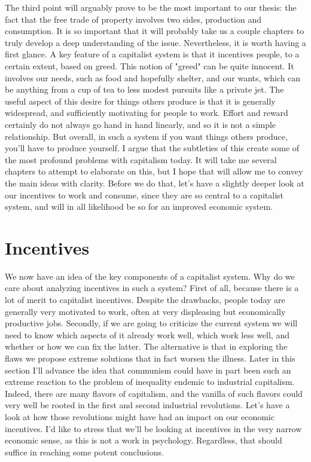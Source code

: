 \documentclass[12pt]{memoir}
\begin{document}
			The third point will arguably prove to be the most important to our thesis: the fact that the free trade of property involves two sides, production and consumption. It is so important that it will probably 
			take us a couple chapters to truly develop a deep understanding of the issue. Nevertheless, it is worth having a first glance. A key feature of a capitalist system is that it incentives people, to a certain 
			extent, based on greed. This notion of "greed" can be quite innocent. It involves our needs, such as food and hopefully shelter, and our wants, which can be anything from a cup of tea to less modest pursuits 
			like a private jet. The useful aspect of this desire for things others produce is that it is generally widespread, and sufficiently motivating for people to work. Effort and reward certainly do not always go 
			hand in hand linearly, and so it is not a simple relationship. But overall, in such a system if you want things others produce, you'll have to produce yourself. I argue that the subtleties of this create some of 
			the most profound problems with capitalism today. It will take me several chapters to attempt to elaborate on this, but I hope that will allow me to convey the main ideas with clarity. Before we do that, let's 
			have a slightly deeper look at our incentives to work and consume, since they are so central to a capitalist system, and will in all likelihood be so for an improved economic system.
		
		\section{Incentives}
			We now have an idea of the key components of a capitalist system. Why do we care about analyzing incentives in such a system? First of all, because there is a lot of merit 
			to capitalist incentives. Despite the drawbacks, people today are generally very motivated to work, often at very displeasing but economically productive jobs. Secondly, if we are going to 
			criticize the current system we will need to know which aspects of it already work well, which work less well, and whether or how we can fix the latter. The alternative is that in exploring the flaws 
			we propose extreme solutions that in fact worsen the illness. Later in this section I'll advance the idea that communism could have in part been such an extreme reaction to the problem of inequality endemic 
			to industrial capitalism. Indeed, there are many flavors of capitalism, and the vanilla of such flavors could very well be rooted in the first and second industrial revolutions. Let's have a look at how those 
			revolutions might have had an impact on our economic incentives. I'd like to stress that we'll be looking at incentives in the very narrow economic sense, as this is not a work in psychology. Regardless, that should 
			suffice in reaching some potent conclusions.\
			
\end{document}

